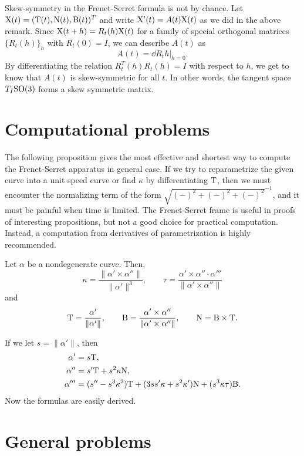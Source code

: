 \documentclass{../../large}
\renewcommand{\a}{\alpha}
\begin{document}
\begin{rmk}
Skew-symmetry in the Frenet-Serret formula is not by chance.
Let $\mathrm{X}(t)=(\mathrm{T}(t),\mathrm{N}(t),\mathrm{B}(t))^T$ and write $\mathrm{X}'(t)=A(t)\mathrm{X}(t)$ as we did in the above remark.
Since $\mathrm{X}(t+h)=R_t(h)\mathrm{X}(t)$ for a family of special orthogonal matrices $\{R_t(h)\}_h$ with $R_t(0)=I$, we can describe $A(t)$ as 
\[A(t)=\left.\dd{R_t}{h}\right\rvert_{h=0}.\]
By differentiating the relation $R_t^T(h)R_t(h)=I$ with respect to $h$, we get to know that $A(t)$ is skew-symmetric for all $t$.
In other words, the tangent space $T_I\mathrm{SO}(3)$ forms a skew symmetric matrix.
\end{rmk}







\section{Computational problems}

The following proposition gives the most effective and shortest way to compute the Frenet-Serret apparatus in general case.
If we try to reparametrize the given curve into a unit speed curve or find $\kappa$ by differentiating $\mathrm{T}$, then we must encounter the normalizing term of the form $\sqrt{(-)^2+(-)^2+(-)^2}^{-1}$, and it must be painful when time is limited.
The Frenet-Serret frame is useful in proofs of interesting propositions, but not a good choice for practical computation.
Instead, a computation from derivatives of parametrization is highly recommended.
\begin{prop}
Let $\a$ be a nondegenerate curve.
Then,
\[\kappa=\frac{\|\a'\times\a''\|}{\|\a'\|^3},\qquad\tau=\frac{\a'\times\a''\cdot\a'''}{\|\a'\times\a''\|}\]
and
\[\rT=\frac{\a'}{\|\a'\|},\qquad\rB=\frac{\a'\times\a''}{\|\a'\times\a''\|},\qquad\rN=\rB\times\rT.\]
\end{prop}
\begin{pf}
If we let $s=\|\a'\|$, then
\begin{align*}
\a'&=s\rT,\\
\a''&=s'\rT+s^2\kappa\rN,\\
\a'''&=(s''-s^3\kappa^2)\rT+(3ss'\kappa+s^2\kappa')\rN+(s^3\kappa\tau)\rB.
\end{align*}
Now the formulas are easily derived.
\end{pf}



\section{General problems}
\end{document}
